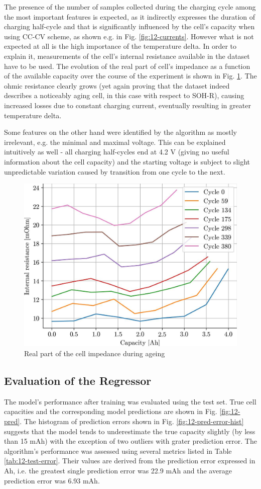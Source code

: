 The presence of the number of samples collected during the charging cycle among the most important features is expected, as it indirectly expresses the duration of charging half-cycle and that is significantly influenced by the cell's capacity when using CC-CV scheme, as shown e.g. in Fig. \ref{fig:12-currents}. However what is not expected at all is the high importance of the temperature delta. In order to explain it, measurements of the cell's internal resistance available in the dataset have to be used. The evolution of the real part of cell's impedance as a function of the available capacity over the course of the experiment is shown in Fig. \ref{fig:12-R}. The ohmic resistance clearly grows (yet again proving that the dataset indeed describes a noticeably aging cell, in this case with respect to SOH-R), causing increased losses due to constant charging current, eventually resulting in greater temperature delta.

Some features on the other hand were identified by the algorithm as mostly irrelevant, e.g. the minimal and maximal voltage. This can be explained intuitively as well - all charging half-cycles end at 4.2 V (giving no useful information about the cell capacity) and the starting voltage is subject to slight unpredictable variation caused by transition from one cycle to the next.

\begin{figure}
    \centering
    \includegraphics[width=0.5\linewidth]{figures/12/R.jpg}
    \caption{Real part of the cell impedance during ageing}
    \label{fig:12-R}
\end{figure}

\subsection{Evaluation of the Regressor}

The model's performance after training was evaluated using the test set. True cell capacities and the corresponding model predictions are shown in Fig. \ref{fig:12-pred}. The histogram of prediction errors shown in Fig. \ref{fig:12-pred-error-hist} suggests that the model tends to underestimate the true capacity slightly (by less than 15 mAh) with the exception of two outliers with grater prediction error.
The algorithm's performance was assessed using several metrics listed in Table \ref{tab:12-test-error}. Their values are derived from the prediction error expressed in Ah, i.e. the greatest single prediction error was 22.9 mAh and the average prediction error was 6.93 mAh.

